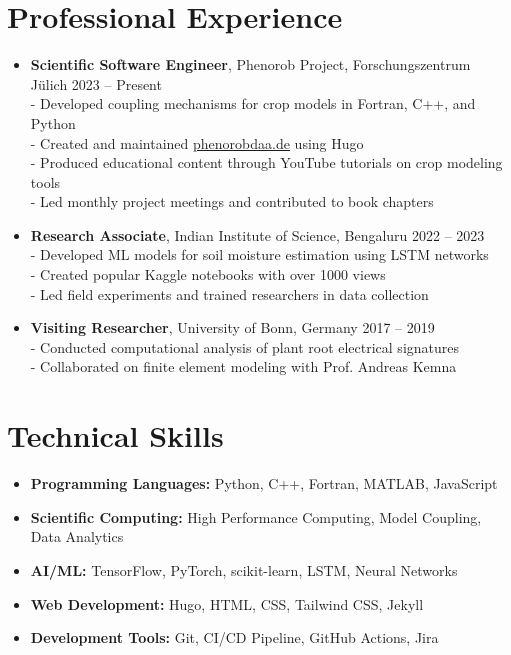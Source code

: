 \documentclass[11pt,a4paper]{article}
\begin{document}
\section*{Professional Experience}
\begin{itemize}[leftmargin=*]
    \item \textbf{Scientific Software Engineer}, Phenorob Project, Forschungszentrum Jülich \hfill 2023 -- Present \\
          - Developed coupling mechanisms for crop models in Fortran, C++, and Python \\
          - Created and maintained \href{http://phenorobdaa.de}{phenorobdaa.de} using Hugo \\
          - Produced educational content through YouTube tutorials on crop modeling tools \\
          - Led monthly project meetings and contributed to book chapters
    
    \item \textbf{Research Associate}, Indian Institute of Science, Bengaluru \hfill 2022 -- 2023 \\
          - Developed ML models for soil moisture estimation using LSTM networks \\
          - Created popular Kaggle notebooks with over 1000 views \\
          - Led field experiments and trained researchers in data collection
    
    \item \textbf{Visiting Researcher}, University of Bonn, Germany \hfill 2017 -- 2019 \\
          - Conducted computational analysis of plant root electrical signatures \\
          - Collaborated on finite element modeling with Prof. Andreas Kemna
\end{itemize}

\section*{Technical Skills}
\begin{itemize}[leftmargin=*]
    \item \textbf{Programming Languages:} Python, C++, Fortran, MATLAB, JavaScript
    \item \textbf{Scientific Computing:} High Performance Computing, Model Coupling, Data Analytics
    \item \textbf{AI/ML:} TensorFlow, PyTorch, scikit-learn, LSTM, Neural Networks
    \item \textbf{Web Development:} Hugo, HTML, CSS, Tailwind CSS, Jekyll
    \item \textbf{Development Tools:} Git, CI/CD Pipeline, GitHub Actions, Jira
\end{itemize}
\end{document}
